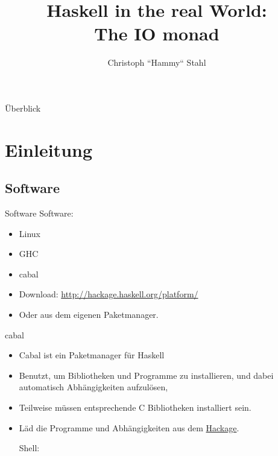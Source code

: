 \documentclass{beamer}
\title{Haskell in the real World: \\ The IO monad}
\author{Christoph ``Hammy`` Stahl}
\begin{document}
\begin{frame}
	\maketitle
\end{frame}
\begin{frame}{Überblick}
\begin{multicols}{2}
\begin{tiny}
\tableofcontents
\end{tiny}
\end{multicols}
\end{frame}

\section{Einleitung}
\subsection{Software}
\begin{frame}[<+->]{Software}
Software:
\begin{itemize}
\item Linux
\item GHC
\item cabal
\item Download: \textcolor{blue}{\url{http://hackage.haskell.org/platform/}}\\
\item Oder aus dem eigenen Paketmanager.
\end{itemize}
\end{frame}

\begin{frame}[<+->][fragile]{cabal}
\begin{itemize}
\item Cabal ist ein Paketmanager f\"ur Haskell
\item Benutzt, um Bibliotheken und Programme zu installieren, und dabei automatisch Abh\"angigkeiten aufzul\"osen,
\item Teilweise m\"ussen entsprechende C Bibliotheken installiert sein.
\item L\"ad die Programme und Abh\"angigkeiten aus dem \textcolor{blue}{\href{http://hackage.haskell.org}{Hackage}}.
\begin{block}{Shell:}
\end{block}
\end{itemize}
\end{frame}
\end{document}
